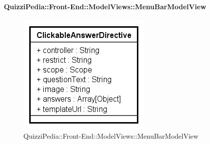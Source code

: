 \paragraph{QuizziPedia::Front-End::ModelViews::MenuBarModelView}

\label{QuizziPedia::Front-End::ModelViews::MenuBarModelView}

\begin{figure}[ht]
	\centering
	\includegraphics[scale=0.5,keepaspectratio]{UML/Classi/Front-End/QuizziPedia_Front-end_Templates_ClickableAnswerTemplate.png}
	\caption{QuizziPedia::Front-End::ModelViews::MenuBarModelView}
\end{figure} \FloatBarrier

